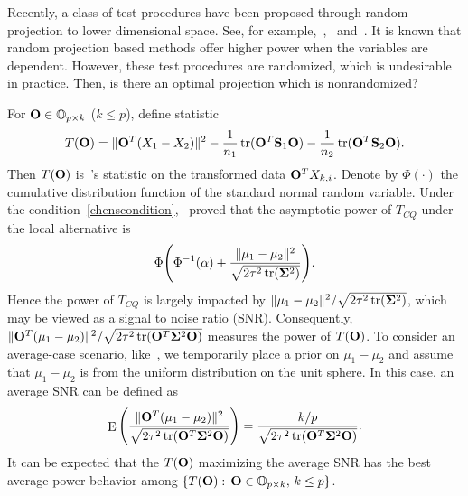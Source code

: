 \documentclass[review]{elsarticle}
\DeclareMathOperator{\mytr}{tr}
\DeclareMathOperator{\myE}{E}
\theoremstyle{plain}
\theoremstyle{definition}
\theoremstyle{remark}
\begin{document}
Recently, a class of test procedures have been proposed through random projection to lower dimensional space. See, for example,~\cite{Lopes2015A},~\cite{Thulin2014A} and~\cite{Srivastava2014RAPTT}.
It is known that random projection based methods offer higher power when the variables are dependent.
However, these test procedures are randomized, which is undesirable in practice.
Then, is there an optimal projection which is nonrandomized?

For $\mathbf{O}\in \mathbb{O}_{p\times k}$ ($k\leq p$), define statistic
$$
    T(\BO)=\|\BO^T(\bar{X}_1-\bar{X}_2)\|^2-\frac{1}{n_1}\mytr(\BO^T \BS_1\BO)-\frac{1}{n_2}\mytr(\BO^T \BS_2\BO).
$$
Then $T(\mathbf{O})$ is~\cite{Chen2010A}'s statistic on the transformed data $\mathbf{O}^T X_{k,i}$.
Denote by $\Phi(\cdot)$ the cumulative distribution function of the standard normal random variable.
Under the condition~\eqref{chenscondition},~\cite{Chen2010A} proved that the asymptotic power of $T_{CQ}$ under the local alternative is
$$
\Phi\Bigg(\Phi^{-1}(\alpha)+\frac{\|\mu_1-\mu_2\|^2}{\sqrt{2\tau^2\mytr(\bSigma^2)}}\Bigg).
$$
Hence the power of $T_{CQ}$ is largely impacted by $\|\mu_1-\mu_2\|^2/\sqrt{2\tau^2\mytr(\bSigma^2)}$, which may be viewed as a signal to noise ratio (SNR).
Consequently, $\|\BO^T (\mu_1-\mu_2)\|^2/\sqrt{2\tau^2\mytr(\BO^T \bSigma^2 \BO)}$ measures the power of $T(\mathbf{O})$.
To consider an average-case scenario, like~\cite{Lopes2015A}, we temporarily place a prior on $\mu_1-\mu_2$ and assume that $\mu_1-\mu_2$ is from the uniform distribution on the unit sphere.
In this case, an average SNR can be defined as
\begin{equation}\label{touteng}
\myE \Bigg( \frac{\|\BO^T (\mu_1-\mu_2)\|^2}{\sqrt{2\tau^2\mytr(\BO^T \bSigma^2 \BO)}}\Bigg)
=  \frac{k/p}{\sqrt{2\tau^2\mytr(\BO^T \bSigma^2 \BO)}}.
\end{equation}
It can be expected that the $T(\mathbf{O})$ maximizing the average SNR has the best average power behavior among $\{T(\mathbf{O}):\, \mathbf{O}\in \mathbb{O}_{p\times k},\,  k\leq p\}$.
\end{document}

